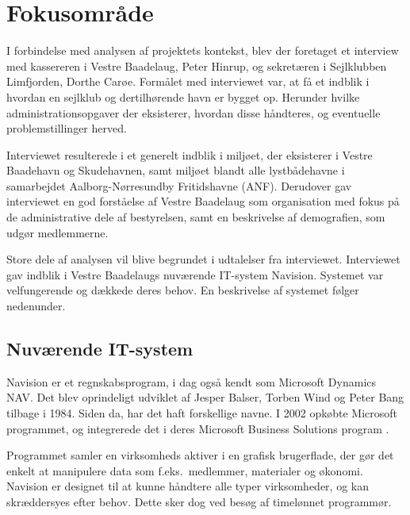 \section{Fokusområde} %


I forbindelse med analysen af projektets kontekst, blev der foretaget et interview med kassereren i Vestre Baadelaug, Peter Hinrup, og sekretæren i Sejlklubben Limfjorden, Dorthe Carøe. Formålet med interviewet var, at få et indblik i hvordan en sejlklub og dertilhørende havn er bygget op. Herunder hvilke administrationsopgaver der eksisterer, hvordan disse håndteres, og eventuelle problemstillinger herved. 

Interviewet resulterede i et generelt indblik i miljøet, der eksisterer i Vestre Baadehavn og Skudehavnen, samt miljøet blandt alle lystbådehavne i samarbejdet Aalborg-Nørresundby Fritidshavne (ANF). Derudover gav interviewet en god forståelse af Vestre Baadelaug som organisation med fokus på de administrative dele af bestyrelsen, samt en beskrivelse af demografien, som udgør medlemmerne.

Store dele af analysen vil blive begrundet i udtalelser fra interviewet. Interviewet gav indblik i Vestre Baadelaugs nuværende IT-system Navision. Systemet var velfungerende og dækkede deres behov. En beskrivelse af systemet følger nedenunder. 

\subsection{Nuværende IT-system} %
\label{sub:nuv_it_system}
Navision er et regnskabsprogram, i dag også kendt som Microsoft Dynamics NAV. Det blev oprindeligt udviklet af Jesper Balser, Torben Wind og Peter Bang tilbage i 1984. Siden da, har det haft forskellige navne. I 2002 opkøbte Microsoft programmet, og integrerede det i deres Microsoft Business Solutions program \cite{visiondata}.

Programmet samler en virksomheds aktiver i en grafisk brugerflade, der gør det enkelt at manipulere data som f.eks.\ medlemmer, materialer og økonomi. Navision er designet til at kunne håndtere alle typer virksomheder, og kan skræddersyes efter behov. Dette sker dog ved besøg af timelønnet programmør.



